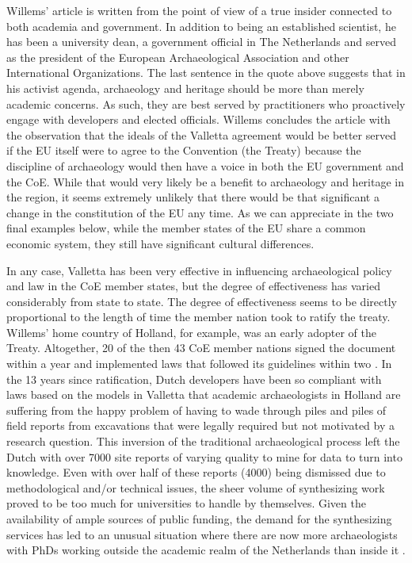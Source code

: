 \documentclass[english]{ijsra}
\begin{document}
Willems’ article is written from the point of view of a true insider connected to both academia and government. In addition to being an established scientist, he has been a university dean, a government official in The Netherlands and served as the president of the European Archaeological Association and other International Organizations. The last sentence in the quote above suggests that in his activist agenda, archaeology and heritage should be more than merely academic concerns. As such, they are best served by practitioners who proactively engage with developers and elected officials. Willems concludes the article with the observation that the ideals of the Valletta agreement would be better served if the EU itself were to agree to the Convention (the Treaty) because the discipline of archaeology would then have a voice in both the EU government and the CoE. While that would very likely be a benefit to archaeology and heritage in the region, it seems extremely unlikely that there would be that significant a change in the constitution of the EU any time. As we can appreciate in the two final examples below, while the member states of the EU share a common economic system, they still have significant cultural differences.  


In any case, Valletta has been very effective in influencing archaeological policy and law in the CoE member states, but the degree of effectiveness has varied considerably from state to state. The degree of effectiveness seems to be directly proportional to the length of time the member nation took to ratify the treaty. Willems’ home country of Holland, for example, was an early adopter of the Treaty. Altogether, 20 of the then 43 CoE member nations signed the document within a year and implemented laws that followed its guidelines within two \parencite[58]{Willems_2007}. 
In the 13 years since ratification, Dutch developers have been so compliant with laws based on the models in Valletta that academic archaeologists in Holland are suffering from the happy problem of having to wade through piles and piles of field reports from excavations that were legally required but not motivated by a research question. This inversion of the traditional archaeological process left the Dutch with over \num{7000} site reports of varying quality to mine for data to turn into knowledge. Even with over half of these reports (\num{4000}) being dismissed due to methodological and/or technical issues, the sheer volume of synthesizing work proved to be too much for universities to handle by themselves. 
Given the availability of ample sources of public funding, the demand for the synthesizing services has led to an unusual situation where there are now more archaeologists with PhDs working outside the academic realm of the Netherlands than inside it \parencite[93]{Groenewoudt_2014}.  
\end{document}
